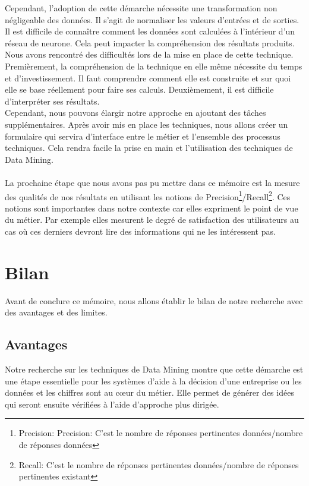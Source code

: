 \documentclass[11pt,a4paper]{report}
\begin{document}
Cependant, l'adoption de cette démarche nécessite une transformation non négligeable des données. Il s'agit de normaliser les valeurs d'entrées et de sorties. Il est difficile de connaître comment les données sont calculées à l'intérieur d'un réseau de neurone. Cela peut impacter la compréhension des résultats produits. Nous avons rencontré des difficultés lors de la mise en place de cette technique. Premièrement, la compréhension de la  technique en elle même nécessite du temps et d'investissement. Il faut comprendre comment elle est construite  et sur quoi elle se base réellement pour faire ses calculs. Deuxièmement, il est difficile d'interpréter ses résultats. \\
Cependant, nous pouvons élargir notre approche en ajoutant des tâches supplémentaires. Après avoir mis en place les techniques, nous allons créer un formulaire  qui servira d'interface entre le métier et l'ensemble des processus techniques. Cela rendra facile la prise en main et l'utilisation des techniques de Data Mining.\\\\
La prochaine étape que nous avons pas pu mettre dans ce mémoire est la mesure des qualités de nos résultats en utilisant les notions de Precision\footnote{Precision: Precision: C'est le nombre de réponses pertinentes données/nombre de réponses données}/Recall\footnote{Recall: C'est le nombre de réponses pertinentes données/nombre de réponses pertinentes existant}. Ces notions sont importantes dans notre contexte car elles expriment le point de vue du métier. Par exemple elles mesurent le degré de satisfaction des utilisateurs au cas où  ces derniers devront lire des informations qui ne les intéressent pas.

\newpage
\section{Bilan \label{bilan}}
Avant de conclure ce mémoire, nous allons établir le bilan de notre recherche avec des avantages et des limites.   
\subsection{Avantages}
Notre recherche sur les techniques de Data Mining montre que cette démarche est une étape essentielle pour les systèmes d'aide à la décision d'une entreprise ou les données et les chiffres sont au cœur du métier. Elle permet de générer des idées qui seront ensuite vérifiées à l'aide d'approche plus dirigée. \\
\end{document}
